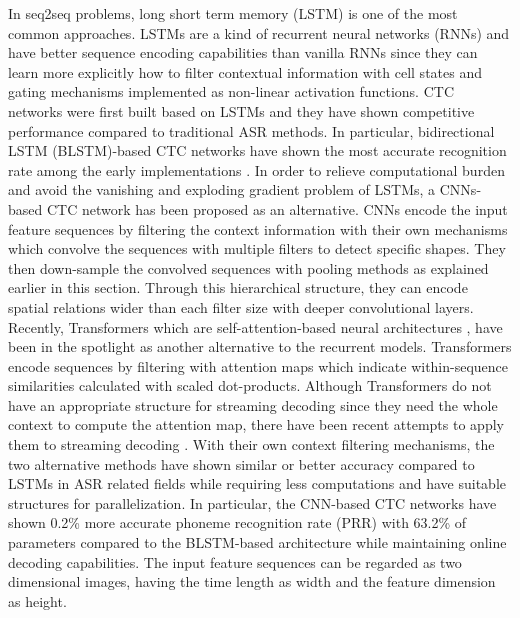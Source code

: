 \documentclass[review]{elsarticle}
\begin{document}
In seq2seq problems, long short term memory (LSTM) \citep{DBLP:journals/neco/HochreiterS97} is one of the most common approaches.
LSTMs are a kind of recurrent neural networks (RNNs) and have better sequence encoding capabilities than vanilla RNNs since they can learn more explicitly how to filter contextual information with cell states and gating mechanisms implemented as non-linear activation functions.
CTC networks were first built based on LSTMs \citep{DBLP:conf/icml/GravesFGS06} and they have shown competitive performance compared to traditional ASR methods.
In particular, bidirectional LSTM (BLSTM)-based CTC networks have shown the most accurate recognition rate among the early implementations \citep{DBLP:conf/icassp/GravesMH13}.
In order to relieve computational burden and avoid the vanishing and exploding gradient problem of LSTMs, a CNNs-based CTC network \citep{DBLP:conf/interspeech/ZhangPBZLBC16} has been proposed as an alternative.
CNNs encode the input feature sequences by filtering the context information with their own mechanisms which convolve the sequences with multiple filters to detect specific shapes.
They then down-sample the convolved sequences with pooling methods as explained earlier in this section.
Through this hierarchical structure, they can encode spatial relations wider than each filter size with deeper convolutional layers.
Recently, Transformers which are self-attention-based neural architectures \citep{DBLP:conf/nips/VaswaniSPUJGKP17}, have been in the spotlight as another alternative to the recurrent models.
Transformers encode sequences by filtering with attention maps which indicate within-sequence similarities calculated with scaled dot-products.
Although Transformers do not have an appropriate structure for streaming decoding since they need the whole context to compute the attention map, there have been recent attempts to apply them to streaming decoding \citep{9054476}.
With their own context filtering mechanisms, the two alternative methods have shown similar or better accuracy compared to LSTMs in ASR related fields \citep{DBLP:conf/interspeech/ZhangPBZLBC16, 8462506, DBLP:journals/corr/abs-1812-06864, 9054476} while requiring less computations and have suitable structures for parallelization.
In particular, the CNN-based CTC networks \citep{DBLP:conf/interspeech/ZhangPBZLBC16} have shown 0.2\% more accurate phoneme recognition rate (PRR) with 63.2\% of parameters compared to the BLSTM-based architecture while maintaining online decoding capabilities.
The input feature sequences can be regarded as two dimensional images, having the time length as width and the feature dimension as height.
\end{document}
